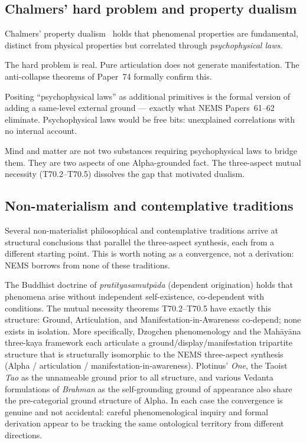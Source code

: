 \documentclass[11pt]{article}
\theoremstyle{remark}
\begin{document}
\subsection{Chalmers' hard problem and property dualism}

Chalmers' property dualism~\cite{Chalmers1995,chalmers1996} holds that phenomenal
properties are fundamental, distinct
from physical properties but correlated through \emph{psychophysical laws}.

\medskip
\begin{termlist}
  \item[What Chalmers gets right]
    The hard problem is real. Pure articulation does not generate manifestation.
    The anti-collapse theorems of Paper~74 formally confirm this.

  \item[Why the cure fails]
    Positing ``psychophysical laws'' as additional primitives is the formal version
    of adding a same-level external ground --- exactly what NEMS Papers~61--62
    eliminate. Psychophysical laws would be free bits: unexplained correlations with
    no internal account.

  \item[The dissolution]
    Mind and matter are not two substances requiring psychophysical laws to bridge
    them. They are two aspects of one Alpha-grounded fact. The three-aspect
    mutual necessity (T70.2--T70.5) dissolves the gap that motivated dualism.
\end{termlist}

\subsection{Non-materialism and contemplative traditions}

Several non-materialist philosophical and contemplative traditions arrive at structural
conclusions that parallel the three-aspect synthesis, each from a different starting
point. This is worth noting as a convergence, not a derivation: NEMS borrows from none
of these traditions.

The Buddhist doctrine of \emph{pratītyasamutpāda} (dependent origination) holds
that phenomena arise without independent self-existence, co-dependent with conditions.
The mutual necessity theorems T70.2--T70.5 have exactly this structure: Ground,
Articulation, and Manifestation-in-Awareness co-depend; none exists in isolation.
More specifically, Dzogchen phenomenology and the Mah\={a}y\={a}na three-kaya
framework each articulate a ground/display/manifestation tripartite structure that
is structurally isomorphic to the NEMS three-aspect synthesis (Alpha / articulation /
manifestation-in-awareness). Plotinus' \emph{One}, the Taoist \emph{Tao} as the
unnameable ground prior to all structure, and various Vedanta formulations of
\emph{Brahman} as the self-grounding ground of appearance also share the pre-categorial
ground structure of Alpha. In each case the convergence is genuine and not accidental:
careful phenomenological inquiry and formal derivation appear to be tracking the same
ontological territory from different directions.
\end{document}
